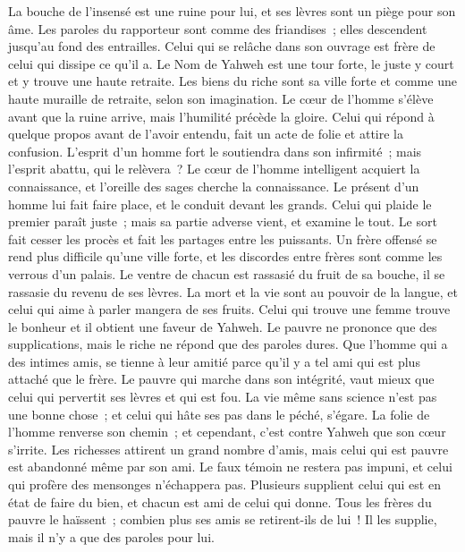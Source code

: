 \begin{multicols}{2}
La bouche de l'insensé est une ruine pour lui, et ses lèvres sont un piège pour son âme.
Les paroles du rapporteur sont comme des friandises~; elles descendent jusqu'au fond des entrailles.
Celui qui se relâche dans son ouvrage est frère de celui qui dissipe ce qu'il a.
Le Nom de Yahweh est une tour forte, le juste y court et y trouve une haute retraite.
Les biens du riche sont sa ville forte et comme une haute muraille de retraite, selon son imagination.
Le cœur de l'homme s'élève avant que la ruine arrive, mais l'humilité précède la gloire.
Celui qui répond à quelque propos avant de l'avoir entendu, fait un acte de folie et attire la confusion.
L'esprit d'un homme fort le soutiendra dans son infirmité~; mais l'esprit abattu, qui le relèvera~?
Le cœur de l'homme intelligent acquiert la connaissance, et l'oreille des sages cherche la connaissance.
Le présent d'un homme lui fait faire place, et le conduit devant les grands.
Celui qui plaide le premier paraît juste~; mais sa partie adverse vient, et examine le tout.
Le sort fait cesser les procès et fait les partages entre les puissants.
Un frère offensé se rend plus difficile qu'une ville forte, et les discordes entre frères sont comme les verrous d'un palais.
Le ventre de chacun est rassasié du fruit de sa bouche, il se rassasie du revenu de ses lèvres.
La mort et la vie sont au pouvoir de la langue, et celui qui aime à parler mangera de ses fruits.
Celui qui trouve une femme trouve le bonheur et il obtient une faveur de Yahweh.
Le pauvre ne prononce que des supplications, mais le riche ne répond que des paroles dures.
Que l'homme qui a des intimes amis, se tienne à leur amitié parce qu'il y a tel ami qui est plus attaché que le frère.
\VerseOne{}Le pauvre qui marche dans son intégrité, vaut mieux que celui qui pervertit ses lèvres et qui est fou.
La vie même sans science n'est pas une bonne chose~; et celui qui hâte ses pas dans le péché, s'égare.
La folie de l'homme renverse son chemin~; et cependant, c'est contre Yahweh que son cœur s'irrite.
Les richesses attirent un grand nombre d'amis, mais celui qui est pauvre est abandonné même par son ami.
Le faux témoin ne restera pas impuni, et celui qui profère des mensonges n'échappera pas.
Plusieurs supplient celui qui est en état de faire du bien, et chacun est ami de celui qui donne.
Tous les frères du pauvre le haïssent~; combien plus ses amis se retirent-ils de lui~! Il les supplie, mais il n'y a que des paroles pour lui.

\end{multicols}
